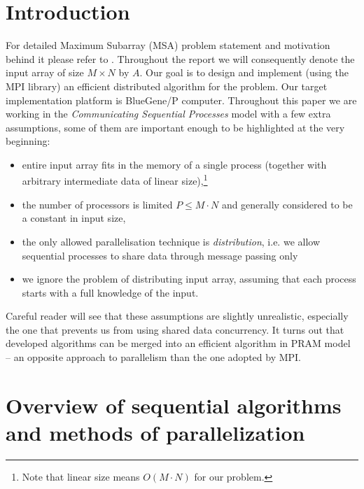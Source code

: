 




\section*{Introduction}

For detailed Maximum Subarray (MSA) problem statement and motivation behind it please refer to \cite{Pearls}.
Throughout the report we  will consequently denote the input array of size $M \times N$ by $A$.
Our goal is to design and implement (using the MPI library) an efficient distributed algorithm for the problem.
Our target implementation platform is BlueGene/P computer.
Throughout this paper we are working in the \emph{Communicating Sequential Processes} model with a few extra assumptions, some of them are important enough to be highlighted at the very beginning:
\begin{itemize}
    \item entire input array fits in the memory of a single process (together with arbitrary intermediate data of linear size),\footnote{Note that linear size means $O(M \cdot N)$ for our problem.}
    \item the number of processors is limited $P \leq M \cdot N$ and generally considered to be a constant in input size,
    \item the only allowed parallelisation technique is \emph{distribution}, i.e. we allow sequential processes to share data through message passing only
    \item we ignore the problem of distributing input array, assuming that each process starts with a full knowledge of the input.
\end{itemize}

Careful reader will see that these assumptions are slightly unrealistic, especially the one that prevents us from using shared data concurrency.
It turns out that developed algorithms can be merged into an efficient algorithm in PRAM model -- an opposite approach to parallelism than the one adopted by MPI.

\section*{Overview of sequential algorithms and methods of parallelization}

